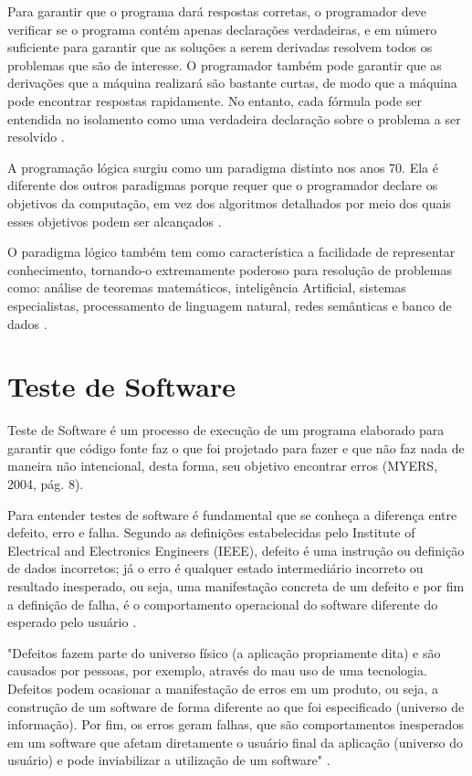 Para garantir que o programa dará respostas corretas, o programador deve verificar se o programa contém apenas declarações verdadeiras, e em número suficiente para garantir que as soluções a serem derivadas resolvem todos os  problemas que são de interesse. O programador também pode garantir que as derivações que a máquina realizará são bastante curtas, de modo que a máquina pode encontrar respostas rapidamente. No entanto, cada fórmula pode ser entendida no isolamento como uma verdadeira declaração sobre o problema a ser resolvido \cite[pág.~2]{spivey1996}.

A programação lógica surgiu como um paradigma distinto nos anos 70. Ela é diferente dos outros paradigmas porque requer que o programador declare os objetivos da computação, em vez dos algoritmos detalhados por meio dos quais esses objetivos podem ser alcançados \cite[pág.~412]{tucker2009}.

O paradigma lógico também tem como característica a facilidade de representar conhecimento, tornando-o extremamente poderoso para resolução de problemas como: análise de teoremas matemáticos, inteligência Artificial, sistemas especialistas, processamento de linguagem natural, redes semânticas e banco de dados \cite{almeida2010}.

\section{Teste de Software}

Teste de Software é um processo de execução de um programa elaborado para garantir que código fonte faz o que foi projetado para fazer e que não faz nada de maneira não intencional, desta forma, seu objetivo encontrar erros \cite[pág.~8]{myers2004} (MYERS, 2004, pág. 8).

Para entender testes de software  é fundamental que se conheça a diferença entre defeito, erro e falha. Segundo as definições estabelecidas pelo Institute of Electrical and Electronics Engineers (IEEE), defeito é uma instrução ou definição de dados incorretos; já o erro é qualquer estado intermediário incorreto ou resultado inesperado, ou seja,  uma manifestação concreta de um defeito e por fim a definição de falha, é o comportamento operacional do software diferente do esperado pelo usuário \cite{ieee}.

\begin{citacao}
"Defeitos fazem parte do universo físico (a aplicação propriamente dita) e são causados por pessoas, por exemplo, através do mau uso de uma tecnologia. Defeitos podem ocasionar a manifestação de erros em um produto, ou seja, a construção de um software de forma diferente ao que foi especificado (universo de informação). Por fim, os erros geram falhas, que são comportamentos inesperados em um software que afetam diretamente o usuário final da aplicação (universo do usuário) e pode inviabilizar a utilização de um software" \cite{neto2005}.
\end{citacao}

